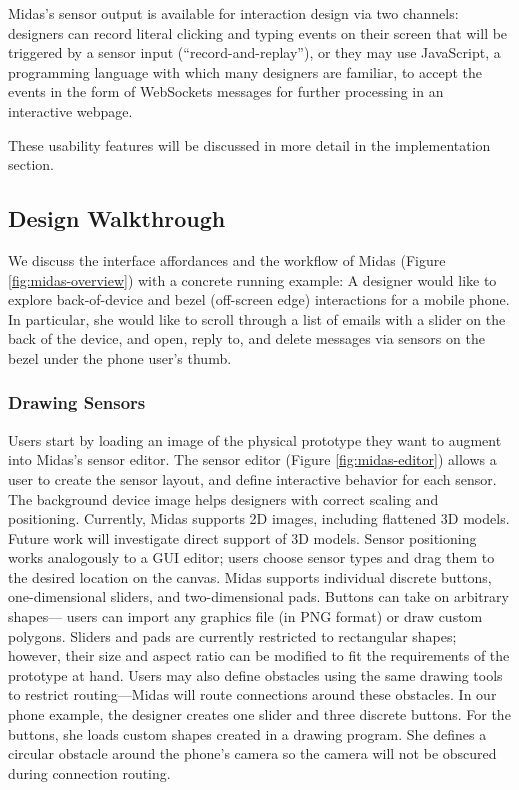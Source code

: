 Midas's sensor output is available for interaction design via two channels: designers can record literal clicking and typing events on their screen that will be triggered by a sensor input (``record-and-replay''), or they may use JavaScript, a programming language with which many designers are familiar, to accept the events in the form of WebSockets messages for further processing in an interactive webpage.

These usability features will be discussed in more detail in the implementation section.

    \subsection{Design Walkthrough}
    
    We discuss the interface affordances and the
workflow of Midas (Figure \ref{fig:midas-overview}) with a concrete running example:
A designer would like to explore back-of-device and
bezel (off-screen edge) interactions for a mobile phone. In particular, she
would like to scroll through a list of emails with a slider on
the back of the device, and open, reply to, and delete messages
via sensors on the bezel under the phone user's thumb.

        \subsubsection{Drawing Sensors}
Users start by loading an image of the physical prototype
they want to augment into Midas's sensor editor. The sensor
editor (Figure \ref{fig:midas-editor}) allows a user to create the sensor layout, and
define interactive behavior for each sensor. The background
device image helps designers with correct scaling and positioning.
Currently, Midas supports 2D images, including
flattened 3D models. Future work will investigate direct support
of 3D models. Sensor positioning works analogously
to a GUI editor; users choose sensor types and drag them to the desired location on the canvas. Midas supports individual
discrete buttons, one-dimensional sliders, and two-dimensional
pads. Buttons can take on arbitrary shapes---
users can import any graphics file (in PNG format) or draw
custom polygons. Sliders and pads are currently restricted
to rectangular shapes; however, their size and aspect ratio
can be modified to fit the requirements of the prototype at
hand. Users may also define obstacles using the same drawing
tools to restrict routing---Midas will route connections
around these obstacles.
In our phone example, the designer creates one slider and
three discrete buttons. For the buttons, she loads custom
shapes created in a drawing program. She defines a circular
obstacle around the phone's camera so the camera will
not be obscured during connection routing.

